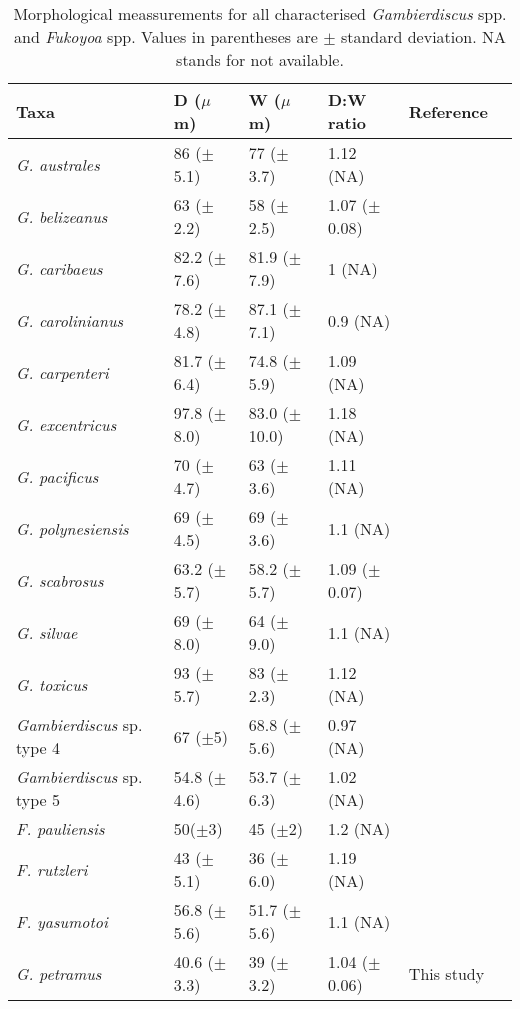 \documentclass[12pt]{article}
\begin{document}
\FloatBarrier
\begin{table}
\caption{Morphological meassurements for all characterised \emph{Gambierdiscus} spp. and \emph{Fukoyoa} spp. Values in parentheses are $\pm$ standard deviation. NA stands for not available.}
\label{tbl:GlobalSizeTable}
\begin{tabular}{ | p{3.5cm} | p{2.5cm} | p{2.5cm} | p{2.5cm} | p{2.5cm} | p{1.8cm} | }
\hline
\textbf{Taxa} &  \textbf{D ($\mu$m)} & \textbf{W ($\mu$m)}  & \textbf{D:W ratio} & \textbf{Reference} \\
 \hline
\textit{G. australes}	& 86 ($\pm$5.1) & 77 ($\pm$3.7) & 1.12 (NA) & \cite{chinain1999morphology} \\
 \hline
 \textit{G. belizeanus}	& 63 ($\pm$2.2) & 58 ($\pm$2.5) & 1.07 ($\pm$0.08) & \cite{chinain1999morphology} \\
 \hline
 \textit{G. caribaeus}	& 82.2 ($\pm$7.6)	& 81.9 ($\pm$7.9)	& 1 (NA) & \cite{litaker2009taxonomy}\\
 \hline
 \textit{G. carolinianus} & 78.2 ($\pm$4.8) & 87.1 ($\pm$7.1) & 0.9 (NA) & \cite{litaker2009taxonomy} \\
 \hline
\textit{G. carpenteri} &	81.7 ($\pm$6.4) &	74.8 ($\pm$5.9) & 1.09 (NA) & \cite{litaker2009taxonomy} \\
 \hline
\textit{G. excentricus	}& 97.8 ($\pm$8.0) &	83.0 ($\pm$10.0) & 1.18 (NA) & \cite{litaker2009taxonomy} \\
 \hline
\textit{G. pacificus}	& 70 ($\pm$4.7) & 63 ($\pm$3.6) & 1.11 (NA) & \cite{chinain1999morphology}\\
 \hline
\textit{G. polynesiensis} & 69 ($\pm$4.5) & 69 ($\pm$3.6) & 1.1 (NA) &	\cite{chinain1999morphology} \\ 
 \hline
\textit{G. scabrosus}	& 63.2 ($\pm$5.7) & 58.2 ($\pm$5.7) & 1.09 ($\pm$0.07) & \cite{nishimura2014morphology}\\
 \hline
 \textit{G. silvae}	& 69 ($\pm$8.0) & 64 ($\pm$9.0) & 1.1 (NA) & \cite{fraga2014genus,litaker2010global}\\
 \hline
\textit{G. toxicus}	& 93 ($\pm$5.7) & 83 ($\pm$2.3) & 1.12 (NA) & \cite{litaker2009taxonomy}\\
 \hline
 \emph{Gambierdiscus} sp. type 4	& 67 ($\pm$5) & 68.8 ($\pm$5.6) & 0.97 (NA) & \cite{xu2014distribution} \\
 \hline
 \emph{Gambierdiscus} sp. type 5 & 54.8 ($\pm$4.6)	& 53.7 ($\pm$6.3)& 1.02 (NA) & \cite{xu2014distribution} \\
 \hline
 \textit{F. pauliensis} & 50($\pm$3) & 45 ($\pm$2) & 1.2 (NA) & \cite{gomez2015fukuyoa} \\
 \hline
\textit{F. rutzleri }& 43 ($\pm$5.1)	& 36 ($\pm$6.0) & 1.19 (NA) & \cite{litaker2009taxonomy}\\
 \hline
\textit{F. yasumotoi }& 56.8 ($\pm$5.6)	& 51.7 ($\pm$5.6) & 1.1 (NA) & \cite{litaker2009taxonomy} \\
 \hline
\textit{G. petramus}  & 40.6 ($\pm$3.3) & 39 ($\pm$3.2) & 1.04 ($\pm$0.06) & This study \\
   \hline
\end{tabular}
\end{table}
\FloatBarrier

\newpage


\end{document}
